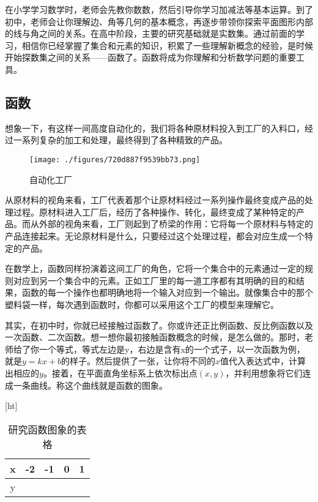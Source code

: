 


在小学学习数学时，老师会先教你数数，然后引导你学习加减法等基本运算。到了初中，老师会让你理解边、角等几何的基本概念，再逐步带领你探索平面图形内部的线与角之间的关系。在高中阶段，主要的研究基础就是实数集。通过前面的学习，相信你已经掌握了集合和元素的知识，积累了一些理解新概念的经验，是时候开始探数集之间的关系——函数了。函数将成为你理解和分析数学问题的重要工具。

\subsection{函数}

想象一下，有这样一间高度自动化的，我们将各种原材料投入到工厂的入料口，经过一系列复杂的加工和处理，最终得到了各种精致的产品。

\begin{figure}[ht]
\centering
\texttt{[image: ./figures/720d887f9539bb73.png]}
\caption{自动化工厂} \label{fig_functi_1}
\end{figure}

从原材料的视角来看，工厂代表着那个让原材料经过一系列操作最终变成产品的处理过程。原材料进入工厂后，经历了各种操作、转化，最终变成了某种特定的产品。而从外部的视角来看，工厂则起到了桥梁的作用：它将每一个原材料与特定的产品连接起来。无论原材料是什么，只要经过这个处理过程，都会对应生成一个特定的产品。

在数学上，函数同样扮演着这间工厂的角色，它将一个集合中的元素通过一定的规则对应到另一个集合中的元素。正如工厂里的每一道工序都有其明确的目的和结果，函数的每一个操作也都明确地将一个输入对应到一个输出。就像集合中的那个塑料袋一样，每次遇到函数时，你都可以采用这个工厂的模型来理解它。

其实，在初中时，你就已经接触过函数了。你或许还正比例函数、反比例函数以及一次函数、二次函数。想一想你最初接触函数概念的时候，是怎么做的。那时，老师给了你一个等式，等式左边是y，右边是含有x的一个式子，以一次函数为例，就是$y=kx+b$的样子。然后提供了一张，让你将不同的$x$值代入表达式中，计算出相应的$y$。接着，在平面直角坐标系上依次标出点$(x,y)$，并利用想象将它们连成一条曲线。称这个曲线就是函数的图象。

\begin{table}\label{tab_functi_1}[ht]
\centering
\caption{研究函数图象的表格}\label{tab_functi1}
\begin{tabular}{|c|c|c|c|c|}
\hline
x & -2 & -1 & 0 & 1 \\
\hline
y &   &   &   &   \\
\hline
\end{tabular}
\end{table}

